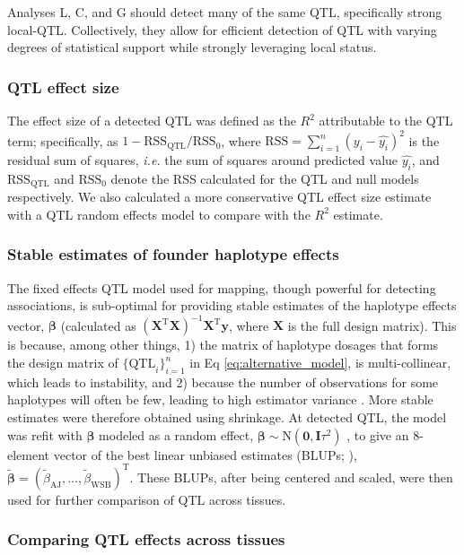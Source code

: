 \documentclass[10pt,letterpaper]{article}
\newcommand{\ie}{\emph{i.e.}\xspace}
\newcommand{\T}{^\mathrm{T}}
\newcommand{\bbeta}{\boldsymbol{\beta}}
\newcommand{\blup}{\widetilde{\bbeta}}
\newcommand{\bzero}{\mathbf{0}}
\newcommand{\bI}{\mathbf{I}}
\newcommand{\bX}{\mathbf{X}}
\newcommand{\by}{\mathbf{y}}
\newcommand{\tausq}{\tau^{2}}
\begin{document}
Analyses L, C, and G should detect many of the same QTL, specifically strong local-QTL. Collectively, they allow for efficient detection of QTL with varying degrees of statistical support while strongly leveraging local status.

\subsubsection*{QTL effect size}

The effect size of a detected QTL was defined as the $R^2$ attributable to the QTL term; specifically, as $1-\text{RSS}_\text{QTL} / \text{RSS}_0$, where $\text{RSS} = \sum_{i = 1}^{n}(y_{i} - \widehat{y_{i}})^{2}$ is the residual sum of squares, \ie the sum of squares around predicted value $\widehat{y_i}$, and $\text{RSS}_{\text{QTL}}$ and $\text{RSS}_0$ denote the RSS calculated for the QTL and null models respectively. We also calculated a more conservative QTL effect size estimate with a QTL random effects model to compare with the $R^{2}$ estimate.

\subsubsection*{Stable estimates of founder haplotype effects} 

The fixed effects QTL model used for mapping, though powerful for detecting associations, is sub-optimal for providing stable estimates of the haplotype effects vector, $\bbeta$ (calculated as $(\bX^{\text{T}}\bX)^{-1}\bX^{\text{T}}\by$, where $\bX$ is the full design matrix). This is because, among other things, 1) the matrix of haplotype dosages that forms the design matrix of $\{\text{QTL}_i\}^n_{i=1}$ in Eq \ref{eq:alternative_model}, is multi-collinear, which leads to instability, and 2) because the number of observations for some haplotypes will often be few, leading to high estimator variance \cite{Zhang2014}. More stable estimates were therefore obtained using shrinkage. At detected QTL, the model was refit with $\bbeta$ modeled as a random effect, $\bbeta \sim \text{N}(\bzero, \bI\tausq)$ \cite{Wei2016}, to give an 8-element vector of the best linear unbiased estimates (BLUPs; \cite{Robinson1991}), $\blup=(\widetilde{\beta}_\text{AJ},\dots,\widetilde{\beta}_\text{WSB})\T$. These BLUPs, after being centered and scaled, were then used for further comparison of QTL across tissues. 

\subsubsection*{Comparing QTL effects across tissues}
\end{document}
